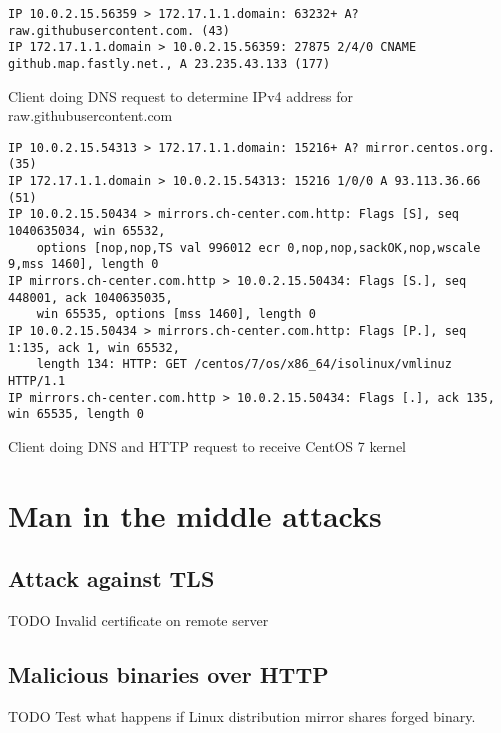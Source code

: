 \begin{table}[!ht]
  \label{tab:dns_request}
  \begin{adjustwidth}{-3.5cm}{}
    \begin{scriptsize}
\begin{verbatim}
IP 10.0.2.15.56359 > 172.17.1.1.domain: 63232+ A? raw.githubusercontent.com. (43)
IP 172.17.1.1.domain > 10.0.2.15.56359: 27875 2/4/0 CNAME github.map.fastly.net., A 23.235.43.133 (177)
\end{verbatim}
    \end{scriptsize}
  \end{adjustwidth}
  \begin{center}
    \caption{Client doing DNS request to determine IPv4 address for
      raw.githubusercontent.com}
  \end{center}
\end{table}


\begin{table}[!ht]
  \label{tab:dns_request}
  \begin{adjustwidth}{-3.5cm}{}
    \begin{scriptsize}
\begin{verbatim}
IP 10.0.2.15.54313 > 172.17.1.1.domain: 15216+ A? mirror.centos.org. (35)
IP 172.17.1.1.domain > 10.0.2.15.54313: 15216 1/0/0 A 93.113.36.66 (51)
IP 10.0.2.15.50434 > mirrors.ch-center.com.http: Flags [S], seq 1040635034, win 65532,
    options [nop,nop,TS val 996012 ecr 0,nop,nop,sackOK,nop,wscale 9,mss 1460], length 0
IP mirrors.ch-center.com.http > 10.0.2.15.50434: Flags [S.], seq 448001, ack 1040635035, 
    win 65535, options [mss 1460], length 0
IP 10.0.2.15.50434 > mirrors.ch-center.com.http: Flags [P.], seq 1:135, ack 1, win 65532, 
    length 134: HTTP: GET /centos/7/os/x86_64/isolinux/vmlinuz HTTP/1.1
IP mirrors.ch-center.com.http > 10.0.2.15.50434: Flags [.], ack 135, win 65535, length 0
\end{verbatim}
    \end{scriptsize}
  \end{adjustwidth}
  \begin{center}
    \caption{Client doing DNS and HTTP request to receive CentOS 7 kernel}
  \end{center}
\end{table}

\section{Man in the middle attacks}

\subsection{Attack against TLS}

TODO Invalid certificate on remote server

\subsection{Malicious binaries over HTTP}

TODO Test what happens if Linux distribution mirror shares forged binary.
